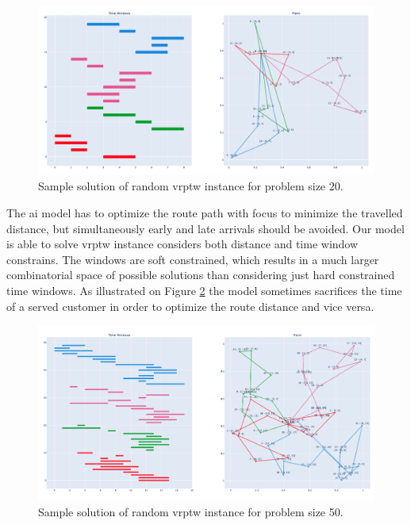 \begin{figure}[ht]
    \centering
    \includegraphics[width=1.0\textwidth]{resources/evaluation/sample-20.png}
    \caption{Sample solution of random \gls{vrptw} instance for problem size 20.}
    \label{fig:sample-20}
\end{figure}

The \gls{ai} model has to optimize the route path with focus to minimize the travelled distance, but simultaneously early and late arrivals should be avoided. Our model is able to solve \gls{vrptw} instance considers both distance and time window constrains. The windows are soft constrained, which results in a much larger combinatorial space of possible solutions than considering just hard constrained time windows. As illustrated on Figure \ref{fig:sample-50} the model sometimes sacrifices the time of a served customer in order to optimize the route distance and vice versa.

\begin{figure}[ht]
    \centering
    \includegraphics[width=1.0\textwidth]{resources/evaluation/sample-50.png}
    \caption{Sample solution of random \gls{vrptw} instance for problem size 50.}
    \label{fig:sample-50}
\end{figure}


